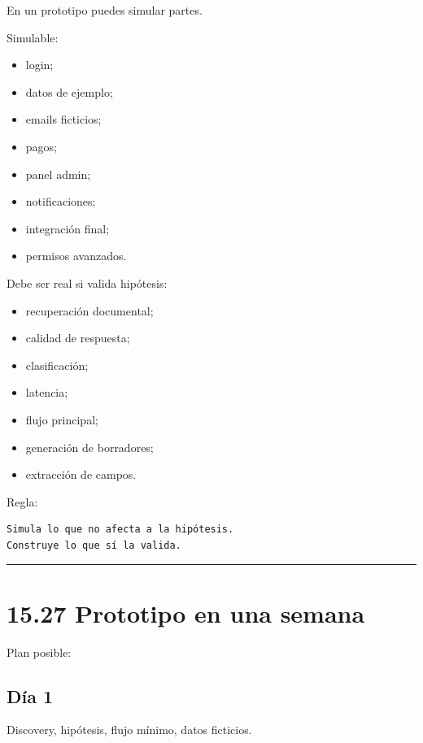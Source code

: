 En un prototipo puedes simular partes.

Simulable:

\begin{itemize}
\tightlist
\item
  login;
\item
  datos de ejemplo;
\item
  emails ficticios;
\item
  pagos;
\item
  panel admin;
\item
  notificaciones;
\item
  integración final;
\item
  permisos avanzados.
\end{itemize}

Debe ser real si valida hipótesis:

\begin{itemize}
\tightlist
\item
  recuperación documental;
\item
  calidad de respuesta;
\item
  clasificación;
\item
  latencia;
\item
  flujo principal;
\item
  generación de borradores;
\item
  extracción de campos.
\end{itemize}

Regla:

\begin{lstlisting}
Simula lo que no afecta a la hipótesis.
Construye lo que sí la valida.
\end{lstlisting}

\begin{center}\rule{0.5\linewidth}{0.5pt}\end{center}

\section{15.27 Prototipo en una semana}\label{prototipo-en-una-semana}

Plan posible:

\subsection{Día 1}\label{duxeda-1}

Discovery, hipótesis, flujo mínimo, datos ficticios.

